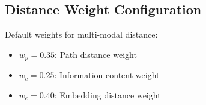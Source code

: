 \documentclass{article}
\begin{document}
\subsection{Distance Weight Configuration}

Default weights for multi-modal distance:
\begin{itemize}
\item $w_p = 0.35$: Path distance weight
\item $w_c = 0.25$: Information content weight
\item $w_e = 0.40$: Embedding distance weight
\end{itemize}
\end{document}
